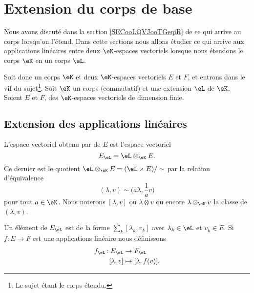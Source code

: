 
\section{Extension du corps de base}
\label{SECooAUOWooNdYTZf}

Nous avons discuté dans la section \ref{SECooLQVJooTGeqiR} de ce qui arrive au corps lorsqu'on l'étend. Dans cette sections nous allons étudier ce qui arrive aux applications linéaires entre deux \( \eK\)-espaces vectoriels lorsque nous étendons le corps \( \eK\) en un corps \( \eL\).

Soit donc un corps \( \eK\) et deux \( \eK\)-espaces vectoriels \( E\) et \( F\), et entrons dans le vif du sujet\footnote{Le sujet étant le corps étendu.}. Soit \( \eK\) un corps (commutatif) et une extension \( \eL\) de \( \eK\). Soient \( E\) et \( F\), des \( \eK\)-espaces vectoriels de dimension finie. 

\subsection{Extension des applications linéaires}


\begin{definition}
    L'espace vectoriel obtenu par  de \( E\) est l'espace vectoriel
    \begin{equation}
        E_{\eL}=\eL\otimes_{\eK}E.
    \end{equation}
    Ce dernier est le quotient \( \eL\otimes_{\eK}E=(\eL\times E)/\sim\) par la relation d'équivalence
    \begin{equation}
        (\lambda,v)\sim\big( a\lambda,\frac{1}{ a }v \big)
    \end{equation}
    pour tout \( a\in \eK\). Nous noterons \( [\lambda,v]\) ou \( \lambda\otimes v\) ou encore \( \lambda\otimes_{\eK}v\) la classe de \( (\lambda,v)\).
\end{definition}
Un élément de \( E_{\eL}\) est de la forme \( \sum_k[\lambda_k,v_k]\) avec \( \lambda_k\in \eL\) et \( v_k\in E\). Si \( f\colon E\to F\) est une applications linéaire nous définissons
\begin{equation}
    \begin{aligned}
        f_{\eL}\colon E_{\eL}&\to F_{\eL} \\
        [\lambda,v]&\mapsto [\lambda,f(v)]. 
    \end{aligned}
\end{equation}

